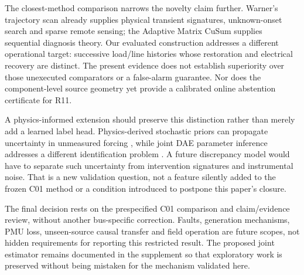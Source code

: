The closest-method comparison narrows the novelty claim further. Warner's
trajectory scan already supplies physical transient signatures, unknown-onset
search and sparse remote sensing; the Adaptive Matrix CuSum supplies
sequential diagnosis theory. Our evaluated construction addresses a different
operational target: successive load/line histories whose restoration and
electrical recovery are distinct. The present evidence does not establish
superiority over those unexecuted comparators or a false-alarm guarantee.
Nor does the component-level source geometry yet provide a calibrated
online abstention certificate for R11.

A physics-informed extension should preserve this distinction rather than
merely add a learned label head. Physics-derived stochastic priors can
propagate uncertainty in unmeasured forcing \cite{ensaf2023kernel,tartakovsky2023gp},
while joint DAE parameter inference addresses a different identification
problem \cite{albustami2026dae}. A future discrepancy model would have to
separate such uncertainty from intervention signatures and instrumental
noise. That is a new validation question, not a feature silently added to
the frozen C01 method or a condition introduced to postpone this paper's closure.

The final decision rests on the prespecified C01 comparison and claim/evidence review, without another bus-specific correction. Faults, generation mechanisms, PMU loss, unseen-source causal transfer and field operation are future scopes, not hidden requirements for reporting this restricted result. The proposed joint estimator remains documented in the supplement so that exploratory work is preserved without being mistaken for the mechanism validated here.
